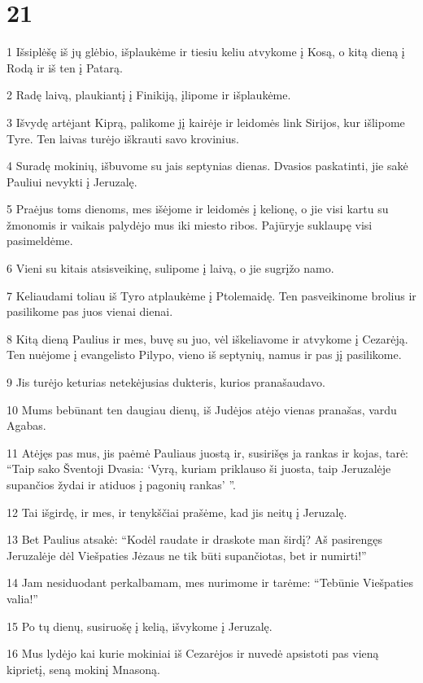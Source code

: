 \chapter{21}


\par 1 Išsiplėšę iš jų glėbio, išplaukėme ir tiesiu keliu atvykome į Kosą, o kitą dieną į Rodą ir iš ten į Patarą. 
\par 2 Radę laivą, plaukiantį į Finikiją, įlipome ir išplaukėme. 
\par 3 Išvydę artėjant Kiprą, palikome jį kairėje ir leidomės link Sirijos, kur išlipome Tyre. Ten laivas turėjo iškrauti savo krovinius. 
\par 4 Suradę mokinių, išbuvome su jais septynias dienas. Dvasios paskatinti, jie sakė Pauliui nevykti į Jeruzalę. 
\par 5 Praėjus toms dienoms, mes išėjome ir leidomės į kelionę, o jie visi kartu su žmonomis ir vaikais palydėjo mus iki miesto ribos. Pajūryje suklaupę visi pasimeldėme. 
\par 6 Vieni su kitais atsisveikinę, sulipome į laivą, o jie sugrįžo namo. 
\par 7 Keliaudami toliau iš Tyro atplaukėme į Ptolemaidę. Ten pasveikinome brolius ir pasilikome pas juos vienai dienai. 
\par 8 Kitą dieną Paulius ir mes, buvę su juo, vėl iškeliavome ir atvykome į Cezarėją. Ten nuėjome į evangelisto Pilypo, vieno iš septynių, namus ir pas jį pasilikome. 
\par 9 Jis turėjo keturias netekėjusias dukteris, kurios pranašaudavo. 
\par 10 Mums bebūnant ten daugiau dienų, iš Judėjos atėjo vienas pranašas, vardu Agabas. 
\par 11 Atėjęs pas mus, jis paėmė Pauliaus juostą ir, susirišęs ja rankas ir kojas, tarė: “Taip sako Šventoji Dvasia: ‘Vyrą, kuriam priklauso ši juosta, taip Jeruzalėje supančios žydai ir atiduos į pagonių rankas’ ”. 
\par 12 Tai išgirdę, ir mes, ir tenykščiai prašėme, kad jis neitų į Jeruzalę. 
\par 13 Bet Paulius atsakė: “Kodėl raudate ir draskote man širdį? Aš pasirengęs Jeruzalėje dėl Viešpaties Jėzaus ne tik būti supančiotas, bet ir numirti!” 
\par 14 Jam nesiduodant perkalbamam, mes nurimome ir tarėme: “Tebūnie Viešpaties valia!” 
\par 15 Po tų dienų, susiruošę į kelią, išvykome į Jeruzalę. 
\par 16 Mus lydėjo kai kurie mokiniai iš Cezarėjos ir nuvedė apsistoti pas vieną kiprietį, seną mokinį Mnasoną. 
